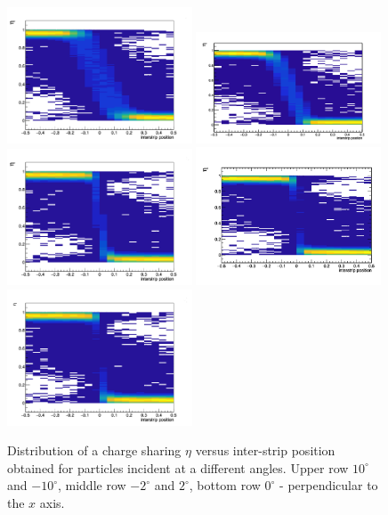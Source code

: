  
 
\begin{figure}[tbph]
\begin{center}
\includegraphics[width = 0.49\textwidth]{figures/eta/eta_2d_10.png} 
\includegraphics[width = 0.49\textwidth]{figures/eta/eta_2d_neg10.png}
\includegraphics[width = 0.49\textwidth]{figures/eta/eta_2d_2.png} 
\includegraphics[width = 0.49\textwidth]{figures/eta/eta_2d_neg2.png} 
\includegraphics[width = 0.49\textwidth]{figures/eta/eta_2d_0.png} 

\caption{Distribution of a charge sharing $\eta$ versus inter-strip position obtained for particles incident at a different angles. Upper row $10^{\circ}$ and $-10^{\circ}$, middle row $-2^{\circ}$ and $2^{\circ}$, bottom row $0^{\circ}$ - perpendicular to the $x$ axis.    }
\label{fig:eta_distribution_2d}
 \end{center}
 \end{figure}
 
